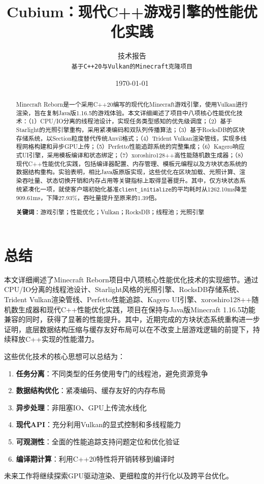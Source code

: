 \documentclass[10pt]{article}
\title{\textbf{Cubium：现代C++游戏引擎的性能优化实践}}
\author{
    技术报告\\
    \texttt{基于C++20与Vulkan的Minecraft克隆项目}
}
\date{\today}
\begin{document}
\maketitle

\begin{abstract}
\noindent
Minecraft Reborn是一个采用C++20编写的现代化Minecraft游戏引擎，使用Vulkan进行渲染，旨在复制Java版1.16.5的游戏体验。本文详细阐述了项目中八项核心性能优化技术：（1）CPU/IO分离的线程池设计，实现任务类型感知的优先级调度；（2）基于Starlight的光照引擎重构，采用紧凑编码和双队列传播算法；（3）基于RocksDB的区块存储系统，以Section粒度替代传统Anvil格式；（4）Trident Vulkan渲染管线，实现多线程网格构建和异步GPU上传；（5）Perfetto性能追踪系统的完整集成；（6）Kagero响应式UI引擎，采用模板编译和状态绑定；（7）xoroshiro128++高性能随机数生成器；（8）现代C++性能优化实践，包括编译器配置、内存管理、模板元编程以及方块状态系统的数据结构重构。实验表明，相比Java版原版实现，这些优化在区块加载、光照计算、渲染吞吐量、状态切换开销和内存占用等关键指标上取得显著提升。其中，仅方块状态系统紧凑化一项，就使客户端初始化基准\texttt{client\_initialize}的平均耗时从1262.10ms降至909.61ms，下降27.93\%，吞吐量提升至原来的1.39倍。

\noindent\textbf{关键词}：游戏引擎；性能优化；Vulkan；RocksDB；线程池；光照引擎
\end{abstract}

\tableofcontents










\section{总结}

本文详细阐述了Minecraft Reborn项目中八项核心性能优化技术的实现细节。通过CPU/IO分离的线程池设计、Starlight风格的光照引擎、RocksDB存储系统、Trident Vulkan渲染管线、Perfetto性能追踪、Kagero UI引擎、xoroshiro128++随机数生成器和现代C++性能优化实践，项目在保持与Java版Minecraft 1.16.5功能兼容的同时，获得了显著的性能提升。其中，近期完成的方块状态系统重构进一步证明，底层数据结构压缩与缓存友好布局可以在不改变上层游戏逻辑的前提下，持续释放C++实现的性能潜力。

这些优化技术的核心思想可以总结为：
\begin{enumerate}
    \item \textbf{任务分离}：不同类型的任务使用专门的线程池，避免资源竞争
    \item \textbf{数据结构优化}：紧凑编码、缓存友好的内存布局
    \item \textbf{异步处理}：非阻塞IO、GPU上传流水线化
    \item \textbf{现代API}：充分利用Vulkan的显式控制和多线程能力
    \item \textbf{可观测性}：全面的性能追踪支持问题定位和优化验证
    \item \textbf{编译期计算}：利用C++20特性将开销转移到编译时
\end{enumerate}

未来工作将继续探索GPU驱动渲染、更细粒度的并行化以及跨平台优化。
\end{document}
